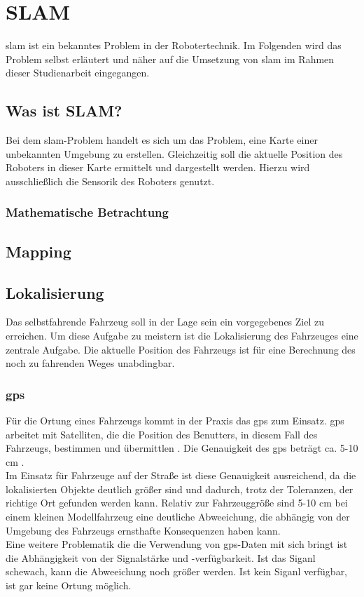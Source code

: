 \section{SLAM}
\ac{slam} ist ein bekanntes Problem in der Robotertechnik. 
Im Folgenden wird das Problem selbst erläutert und näher auf die Umsetzung von \ac{slam} im Rahmen dieser Studienarbeit eingegangen.

\subsection{Was ist SLAM?}
Bei dem \ac{slam}-Problem handelt es sich um das Problem, eine Karte einer unbekannten Umgebung zu erstellen.
Gleichzeitig soll die aktuelle Position des Roboters in dieser Karte ermittelt und dargestellt werden.
Hierzu wird ausschließlich die Sensorik des Roboters genutzt.

\subsubsection{Mathematische Betrachtung}


\subsection{Mapping}

\subsection{Lokalisierung}
Das selbstfahrende Fahrzeug soll in der Lage sein ein vorgegebenes Ziel zu erreichen. 
Um diese Aufgabe zu meistern ist die Lokalisierung des Fahrzeuges eine zentrale Aufgabe. 
Die aktuelle Position des Fahrzeugs ist für eine Berechnung des noch zu fahrenden Weges unabdingbar.

\subsubsection{\acf{gps}}
Für die Ortung eines Fahrzeugs kommt in der Praxis das \ac{gps} zum Einsatz. \ac{gps} arbeitet mit Satelliten, die die Position des Benutters, in diesem Fall des Fahrzeugs, bestimmen
und übermittlen \cite{ashby2003relativity}. Die Genauigkeit des \ac{gps} beträgt ca. 5-10 cm \cite{ashby2003relativity}. \\
Im Einsatz für Fahrzeuge auf der Straße ist diese Genauigkeit ausreichend, da die lokalisierten Objekte deutlich größer sind und dadurch, trotz der Toleranzen, der richtige Ort gefunden werden kann.
Relativ zur Fahrzeuggröße sind 5-10 cm bei einem kleinen Modellfahrzeug eine deutliche Abweeichung, die abhängig von der Umgebung des Fahrzeugs ernsthafte Konsequenzen haben kann. \\
Eine weitere Problematik die die Verwendung von \ac{gps}-Daten mit sich bringt ist die Abhängigkeit von der Signalstärke und -verfügbarkeit. Ist das Siganl schewach, kann die Abweeichung noch größer werden. Ist kein Siganl
verfügbar, ist gar keine Ortung möglich.

